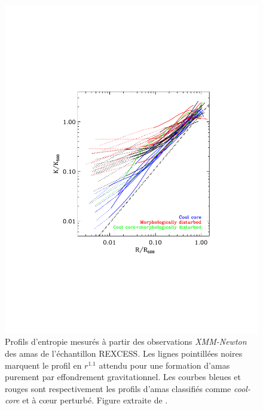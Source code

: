 \begin{figure}[t]
    \centering
    \includegraphics[width=.6\linewidth]{Figures/Chap_nk/entropy_pratt.pdf}
    \caption{
        Profils d'entropie mesurés à partir des observations \textit{XMM-Newton} des amas de l'échantillon REXCESS.
        Les lignes pointillées noires marquent le profil en $r^{1.1}$ attendu pour une formation d'amas purement par effondrement gravitationnel.
        Les courbes bleues et rouges sont respectivement les profils d'amas classifiés comme \textit{cool-core} et à cœur perturbé.
        Figure extraite de \cite{pratt_gas_2010}.
    }
    \label{fig:entropy_rexcess}
\end{figure}

